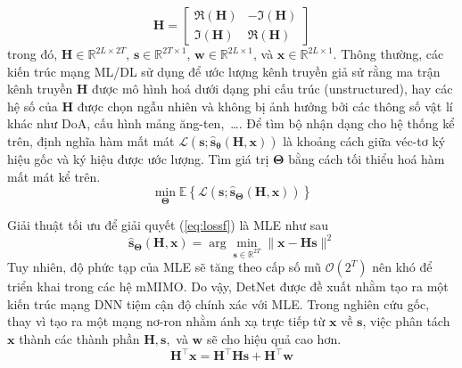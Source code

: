 \begin{equation}
\label{eq:matrixtras2}
    \mathbf{H}=\left[\begin{array}{cc}
    \Re(\mathbf{H}) & -\Im(\mathbf{H}) \\
    \Im(\mathbf{H}) & \Re(\mathbf{H})
    \end{array}\right]
\end{equation}
trong đó, $\mathbf{H} \in \mathbb{R}^{2L \times 2T}$, $\mathbf{s} \in \mathbb{R}^{2T \times 1}$, $\mathbf{w} \in \mathbb{R}^{2L \times 1}$, và $\mathbf{x} \in \mathbb{R}^{2L \times 1}$. Thông thường, các kiến trúc mạng ML/DL sử dụng để ước lượng kênh truyền giả sử rằng ma trận kênh truyền $\mathbf{H}$ được mô hình hoá dưới dạng phi cấu trúc (unstructured), hay các hệ số của $\mathbf{H}$ được chọn ngẫu nhiên và không bị ảnh hưởng bởi các thông số vật lí khác như DoA, cấu hình mảng ăng-ten,~\ldots . Để tìm bộ nhận dạng cho hệ thống kể trên, định nghĩa hàm mất mát $\mathcal{L}\left(\mathbf{s} ; \hat{\mathbf{s}}_{\boldsymbol{\theta}}(\mathbf{H}, \mathbf{x})\right)$ là khoảng cách giữa véc-tơ ký hiệu gốc và ký hiệu được ước lượng. Tìm giá trị $\boldsymbol{\Theta}$ bằng cách tối thiểu hoá hàm mất mát kể trên.
\begin{equation}
\label{eq:lossf}
\min _{\boldsymbol{\Theta}} \mathbb{E}\left\{\mathcal{L}\left(\mathbf{s} ; \hat{\mathbf{s}}_{\boldsymbol{\Theta}}(\mathbf{H}, \mathbf{x})\right)\right\}
\end{equation}

Giải thuật tối ưu để giải quyết (\ref{eq:lossf}) là MLE như sau
\begin{equation}
\label{eq:mle}
\hat{\mathbf{s}}_{\boldsymbol{\Theta}}(\mathbf{H}, \mathbf{x})=\arg \min _{\mathbf{s} \in \mathbb{R}^{2T}}\|\mathbf{x}-\mathbf{H} \mathbf{s}\|^2
\end{equation}
Tuy nhiên, độ phức tạp của MLE sẽ tăng theo cấp số mũ $\mathcal{O}(2^T)$ nên khó để triển khai trong các hệ mMIMO. Do vậy, DetNet được đề xuất nhằm tạo ra một kiến trúc mạng DNN tiệm cận độ chính xác với MLE. Trong nghiên cứu gốc, thay vì tạo ra một mạng nơ-ron nhằm ánh xạ trực tiếp từ $\mathbf{x}$ về $\mathbf{s}$, việc phân tách $\mathbf{x}$ thành các thành phần $\mathbf{H}, \mathbf{s},$ và $\mathbf{w}$ sẽ cho hiệu quả cao hơn.
\begin{equation}
    \mathbf{H}^\top \mathbf{x}=\mathbf{H}^\top \mathbf{H s}+\mathbf{H}^\top \mathbf{w}
\end{equation}

